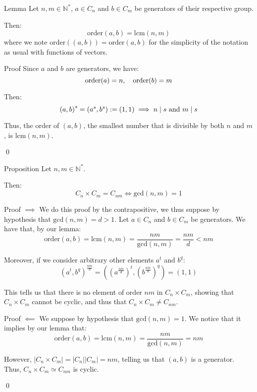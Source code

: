 \documentclass[a4paper]{article}
\begin{document}
\begin{parag}{Lemma}
    Let $n, m \in \mathbb{N}^*$, $a \in C_n$ and $b \in C_m$ be generators of their respective group.

    Then: 
    \[\text{order}\left(a, b\right) = \text{lcm}\left(n, m\right)\]
    where we note $\text{order}\left(\left(a, b\right)\right) = \text{order}\left(a, b\right)$ for the simplicity of the notation as usual with functions of vectors.

    \begin{subparag}{Proof}
        Since $a$ and $b$ are generators, we have: 
        \[\text{order}\left(a\right) = n, \mathspace \text{order}\left(b\right) = m\]
        
        Then: 
        \[\left(a, b\right)^s = \left(a^s, b^s\right) := \left(1, 1\right) \implies n \divides s \text{ and } m \divides s\]
        
        Thus, the order of $\left(a, b\right)$, the smallest number that is divisible by both $n$ and $m$, is $\text{lcm}\left(n, m\right)$.

        \qed
    \end{subparag}
\end{parag}

\begin{parag}{Proposition}
    Let $n, m \in \mathbb{N}^*$. 

    Then:
    \[C_n \times C_m = C_{nm} \iff \text{gcd}\left(n, m\right) = 1\]

    \begin{subparag}{Proof $\implies$}
        We do this proof by the contrapositive, we thus suppose by hypothesis that $\text{gcd}\left(n, m\right) = d > 1$. Let $a \in C_n$ and $b \in C_m$ be generators. We have that, by our lemma: 
        \[\text{order}\left(a, b\right) = \text{lcm}\left(n, m\right) = \frac{nm}{ \text{gcd}\left(n, m\right)} = \frac{nm}{d} < nm\]
        
        Moreover, if we consider arbitrary other elements $a^t$ and $b^q$: 
        \[\left(a^t, b^q\right)^{\frac{nm}{d}} = \left(\left(a^{\frac{nm}{d}}\right)^t, \left(b^{\frac{nm}{d}}\right)^q\right) = \left(1, 1\right)\]
        
        This tells us that there is no element of order $nm$ in $C_n \times C_m$, showing that $C_n \times C_m$ cannot be cyclic, and thus that $C_n \times C_m \neq C_{nm}$.
    \end{subparag}
    
    \begin{subparag}{Proof $\impliedby$}
        We suppose by hypothesis that $\text{gcd}\left(n, m\right) = 1$. We notice that it implies by our lemma that: 
        \[\text{order}\left(a, b\right) = \text{lcm}\left(n, m\right)= \frac{nm}{\text{gcd}\left(n, m\right)} = nm\]

        However, $\left|C_n \times C_m\right| = \left|C_n\right| \left|C_m\right| = nm$, telling us that $\left(a, b\right)$ is a generator. Thus, $C_n \times C_m \simeq C_{nm}$ is cyclic.

        \qed
    \end{subparag}
\end{parag}
\end{document}

